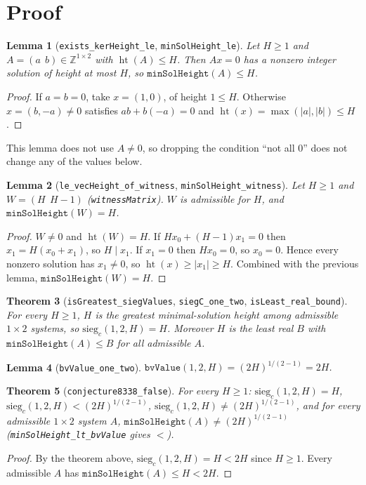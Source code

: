 \documentclass[11pt]{article}
\newtheorem{theorem}{Theorem}
\newtheorem{lemma}[theorem]{Lemma}
\theoremstyle{definition}
\newcommand{\hgt}{\operatorname{ht}}
\begin{document}
\section{Proof}

\begin{lemma}[\texttt{exists\_kerHeight\_le}, \texttt{minSolHeight\_le}]
Let $H\ge 1$ and $A=(a\ \ b)\in\mathbb{Z}^{1\times 2}$ with $\hgt(A)\le H$. Then $Ax=0$ has a
nonzero integer solution of height at most $H$, so $\texttt{minSolHeight}(A)\le H$.
\end{lemma}
\begin{proof}
If $a=b=0$, take $x=(1,0)$, of height $1\le H$. Otherwise $x=(b,-a)\neq 0$ satisfies
$ab+b(-a)=0$ and $\hgt(x)=\max(|a|,|b|)\le H$.
\end{proof}

This lemma does not use $A\ne 0$, so dropping the condition ``not all $0$'' does not change any
of the values below.

\begin{lemma}[\texttt{le\_vecHeight\_of\_witness}, \texttt{minSolHeight\_witness}]
Let $H\ge1$ and $W=(H\ \ H-1)$ (\texttt{witnessMatrix}). $W$ is admissible for $H$, and
$\texttt{minSolHeight}(W)=H$.
\end{lemma}
\begin{proof}
$W\neq0$ and $\hgt(W)=H$. If $Hx_0+(H-1)x_1=0$ then $x_1=H(x_0+x_1)$, so $H\mid x_1$. If $x_1=0$
then $Hx_0=0$, so $x_0=0$. Hence every nonzero solution has $x_1\neq 0$, so
$\hgt(x)\ge|x_1|\ge H$. Combined with the previous lemma, $\texttt{minSolHeight}(W)=H$.
\end{proof}

\begin{theorem}[\texttt{isGreatest\_siegValues}, \texttt{siegC\_one\_two}, \texttt{isLeast\_real\_bound}]
For every $H\ge1$, $H$ is the greatest minimal-solution height among admissible $1\times2$
systems, so $\mathrm{sieg}_c(1,2,H)=H$. Moreover $H$ is the least real $B$ with
$\texttt{minSolHeight}(A)\le B$ for all admissible $A$.
\end{theorem}

\begin{lemma}[\texttt{bvValue\_one\_two}]
$\texttt{bvValue}(1,2,H)=(2H)^{1/(2-1)}=2H$.
\end{lemma}

\begin{theorem}[\texttt{conjecture8338\_false}]
For every $H\ge1$:
$\mathrm{sieg}_c(1,2,H)=H$, $\mathrm{sieg}_c(1,2,H)<(2H)^{1/(2-1)}$,
$\mathrm{sieg}_c(1,2,H)\ne(2H)^{1/(2-1)}$, and for every admissible $1\times 2$ system $A$,
$\texttt{minSolHeight}(A)\ne(2H)^{1/(2-1)}$ (\texttt{minSolHeight\_lt\_bvValue} gives $<$).
\end{theorem}
\begin{proof}
By the theorem above, $\mathrm{sieg}_c(1,2,H)=H<2H$ since $H\ge 1$. Every admissible $A$ has
$\texttt{minSolHeight}(A)\le H<2H$.
\end{proof}
\end{document}
